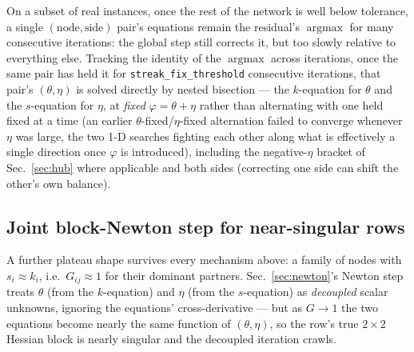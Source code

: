 \documentclass[10pt]{article}
\newcommand{\argmax}{\operatorname{argmax}}
\begin{document}
On a subset of real instances, once the rest of the network is well below
tolerance, a single $(\text{node}, \text{side})$ pair's equations remain
the residual's $\argmax$ for many consecutive iterations: the global step
still corrects it, but too slowly relative to everything else. Tracking
the identity of the $\argmax$ across iterations, once the same pair has
held it for \texttt{streak\_fix\_threshold} consecutive iterations, that
pair's $(\theta,\eta)$ is solved directly by nested bisection --- the
$k$-equation for $\theta$ and the $s$-equation for $\eta$, at \emph{fixed}
$\varphi=\theta+\eta$ rather than alternating with one held fixed at a
time (an earlier $\theta$-fixed/$\eta$-fixed alternation failed to
converge whenever $\eta$ was large, the two 1-D searches fighting each
other along what is effectively a single direction once $\varphi$ is
introduced), including the negative-$\eta$ bracket of
Sec.~\ref{sec:hub} where applicable and both sides (correcting one side
can shift the other's own balance).

\subsection{Joint block-Newton step for near-singular rows}
\label{sec:block-newton}

A further plateau shape survives every mechanism above: a family of nodes
with $s_i\approx k_i$, i.e.\ $G_{ij}\approx1$ for their dominant partners.
Sec.~\ref{sec:newton}'s Newton step treats $\theta$ (from the
$k$-equation) and $\eta$ (from the $s$-equation) as \emph{decoupled}
scalar unknowns, ignoring the equations' cross-derivative --- but as
$G\to1$ the two equations become nearly the same function of $(\theta,\eta)$,
so the row's true $2\times2$ Hessian block is nearly singular and the
decoupled iteration crawls.
\end{document}
